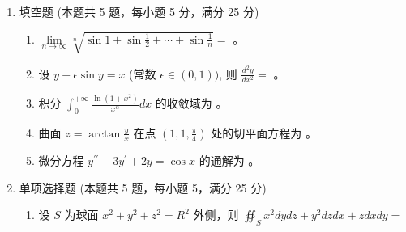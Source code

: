 

\begin{enumerate}
	\item
	填空题 (本题共 5 题，每小题 5 分，满分 25 分)
	\begin{enumerate}
		\item
	$\lim\limits _{n \rightarrow \infty} \sqrt[n]{\sin 1+\sin \frac{1}{2}+\cdots+\sin \frac{1}{n}}=$  。
		
		
		\item
		设 $y-\epsilon \sin y=x$ (常数 $\epsilon \in(0,1))$, 则 $\frac{d^{2} y}{d x^{2}}=$  。
		
		
		\item
		积分 $\int_{0}^{+\infty} \frac{\ln \left(1+x^{2}\right)}{x^{\alpha}} d x$ 的收敛域为  。
		
		
		\item
		 曲面 $z=\arctan \frac{y}{x}$ 在点 $\left(1,1, \frac{\pi}{4}\right)$ 处的切平面方程为  。
		
		
		\item
		微分方程 $y^{\prime \prime}-3 y^{\prime}+2 y=\cos x$ 的通解为  。
		
		
		
		
	\end{enumerate}
	
\item 
单项选择题 (本题共 5 题，每小题 5，满分 25 分)	
\begin{enumerate}
	\item
设 $S$ 为球面 $x^{2}+y^{2}+z^{2}=R^{2}$ 外侧，则 $\oiint_{S} x^{2} d y d z+y^{2} d z d x+z d x d y=$  


\end{enumerate}
\end{enumerate}

